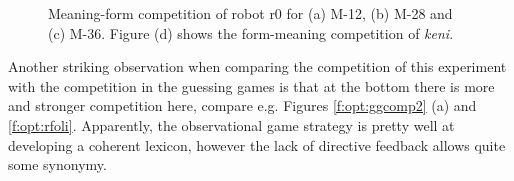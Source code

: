\begin{figure}[t]
\centering
{}
\caption{Meaning-form competition of robot r0 for (a) M-12, (b) M-28 and (c) M-36. Figure (d) shows the form-meaning competition of {\it keni}.}
\label{f:opt:cfoli}
\end{figure}


Another striking observation when comparing the competition of this experiment with the competition in the guessing games is that at the bottom there is more and stronger competition here, compare e.g. Figures \ref{f:opt:ggcomp2} (a) and \ref{f:opt:rfoli}. Apparently, the observational game strategy is pretty well at developing a coherent lexicon, however the lack of directive feedback allows quite some synonymy. 


